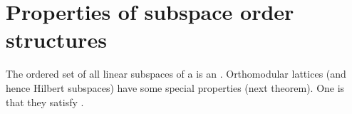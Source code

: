 

\section{Properties of subspace order structures}
The ordered set of all linear subspaces of a  is an .
Orthomodular lattices (and hence Hilbert subspaces) have some special properties (next theorem).
One is that they satisfy .

